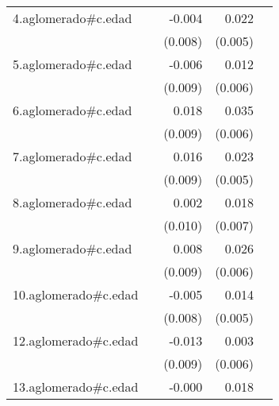 {\begin{longtable}{l*{4}{D{.}{.}{-1}}}
\addlinespace
4.aglomerado#c.edad&                     &      -0.004         &       0.022\sym{***}&                     \\
            &                     &     (0.008)         &     (0.005)         &                     \\
\addlinespace
5.aglomerado#c.edad&                     &      -0.006         &       0.012\sym{*}  &                     \\
            &                     &     (0.009)         &     (0.006)         &                     \\
\addlinespace
6.aglomerado#c.edad&                     &       0.018\sym{*}  &       0.035\sym{***}&                     \\
            &                     &     (0.009)         &     (0.006)         &                     \\
\addlinespace
7.aglomerado#c.edad&                     &       0.016         &       0.023\sym{***}&                     \\
            &                     &     (0.009)         &     (0.005)         &                     \\
\addlinespace
8.aglomerado#c.edad&                     &       0.002         &       0.018\sym{*}  &                     \\
            &                     &     (0.010)         &     (0.007)         &                     \\
\addlinespace
9.aglomerado#c.edad&                     &       0.008         &       0.026\sym{***}&                     \\
            &                     &     (0.009)         &     (0.006)         &                     \\
\addlinespace
10.aglomerado#c.edad&                     &      -0.005         &       0.014\sym{**} &                     \\
            &                     &     (0.008)         &     (0.005)         &                     \\
\addlinespace
12.aglomerado#c.edad&                     &      -0.013         &       0.003         &                     \\
            &                     &     (0.009)         &     (0.006)         &                     \\
\addlinespace
13.aglomerado#c.edad&                     &      -0.000         &       0.018\sym{***}&                     \\

\end{longtable}}
